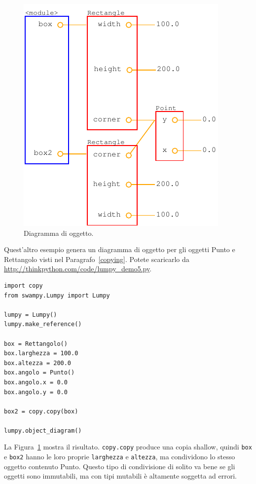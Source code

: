 \documentclass[10pt]{book}
\begin{document}
\begin{figure}
\centerline
{\includegraphics[scale=0.7]{figs/lumpydemo5.pdf}}
\caption{Diagramma di oggetto.}
\label{fig.lumpy5}
\end{figure}

Quest'altro esempio genera un diagramma di oggetto per gli oggetti Punto e Rettangolo visti nel Paragrafo~\ref{copying}.  Potete scaricarlo da
\url{http://thinkpython.com/code/lumpy_demo5.py}.

\begin{verbatim}
import copy
from swampy.Lumpy import Lumpy

lumpy = Lumpy()
lumpy.make_reference()

box = Rettangolo()
box.larghezza = 100.0
box.altezza = 200.0
box.angolo = Punto()
box.angolo.x = 0.0
box.angolo.y = 0.0

box2 = copy.copy(box)

lumpy.object_diagram()
\end{verbatim}

La Figura~\ref{fig.lumpy5} mostra il risultato.  {\tt copy.copy} produce una copia shallow, quindi {\tt box} e {\tt box2} hanno le loro proprie {\tt larghezza} e {\tt altezza}, ma condividono lo stesso oggetto contenuto Punto. Questo tipo di condivisione di solito va bene se gli oggetti sono immutabili, ma con tipi mutabili è altamente soggetta ad errori.
\end{document}
